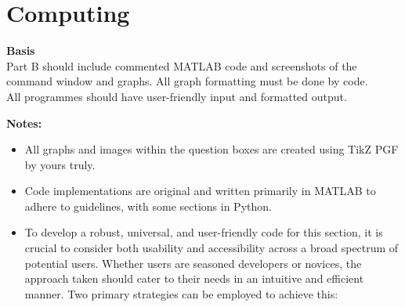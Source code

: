 \documentclass[a4paper, 12pt]{report}
\begin{document}
    \chapter{Computing}    
    \thispagestyle{empty}
    \textbf{Basis}\\
    Part B should include commented MATLAB code and
    screenshots of the command window and graphs. All graph formatting must be done by code.\\
    All programmes should have user-friendly input and formatted output.\\
    \vspace{0.4em}
    \begin{center}
        \Large\textbf{Notes:}
    \end{center}
    \begin{itemize} 
        \item All graphs and images within the question boxes are created using TikZ PGF by yours truly. 
        \item Code implementations are original and written primarily in MATLAB to adhere to guidelines, with some sections in Python.
        \item To develop a robust, universal, and user-friendly code for this section, it is crucial to consider both usability and accessibility across a broad spectrum of potential users. Whether users are seasoned developers or novices, the approach taken should cater to their needs in an intuitive and efficient manner. Two primary strategies can be employed to achieve this:
        

\end{itemize}
\end{document}
